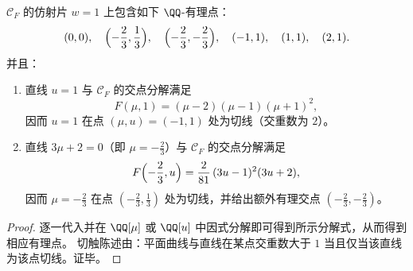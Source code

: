 \begin{proposition}[两条有理直线的切触构型与显式有理点]\label{prop:fold-gauge-anomaly-trigonal-rational-tangency}
\(\mathcal C_F\) 的仿射片 \(w=1\) 上包含如下 \(\QQ\)-有理点：
\[
(0,0),\quad \Bigl(-\frac23,\frac13\Bigr),\quad \Bigl(-\frac23,-\frac23\Bigr),\quad (-1,1),\quad (1,1),\quad (2,1).
\]
并且：
\begin{enumerate}
  \item 直线 \(u=1\) 与 \(\mathcal C_F\) 的交点分解满足
  \[
  F(\mu,1)=(\mu-2)(\mu-1)(\mu+1)^{2},
  \]
  因而 \(u=1\) 在点 \((\mu,u)=(-1,1)\) 处为切线（交重数为 \(2\)）。
  \item 直线 \(3\mu+2=0\)（即 \(\mu=-\tfrac23\)）与 \(\mathcal C_F\) 的交点分解满足
  \[
  F\Bigl(-\frac23,u\Bigr)=\frac{2}{81}\,(3u-1)^{2}(3u+2),
  \]
  因而 \(\mu=-\tfrac23\) 在点 \((-\tfrac23,\tfrac13)\) 处为切线，并给出额外有理交点 \((-\tfrac23,-\tfrac23)\)。
\end{enumerate}
\end{proposition}
\begin{proof}
逐一代入并在 \(\QQ[\mu]\) 或 \(\QQ[u]\) 中因式分解即可得到所示分解式，从而得到相应有理点。
切触陈述由：平面曲线与直线在某点交重数大于 \(1\) 当且仅当该直线为该点切线。证毕。
\end{proof}

